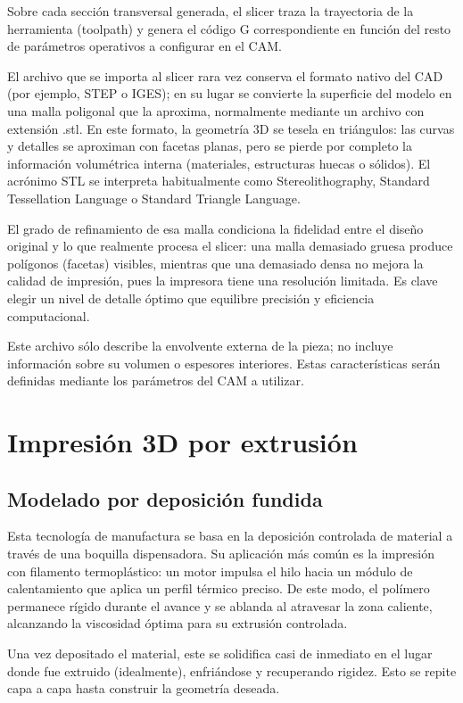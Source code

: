 Sobre cada sección transversal generada, el slicer traza la trayectoria de la herramienta (toolpath) y genera el código G correspondiente en función del resto de parámetros operativos a configurar en el CAM.

El archivo que se importa al slicer rara vez conserva el formato nativo del CAD (por ejemplo, STEP o IGES); en su lugar se convierte la superficie del modelo en una malla poligonal que la aproxima, normalmente mediante un archivo con extensión .stl. En este formato, la geometría 3D se tesela en triángulos: las curvas y detalles se aproximan con facetas planas, pero se pierde por completo la información volumétrica interna (materiales, estructuras huecas o sólidos). El acrónimo STL se interpreta habitualmente como Stereolithography, Standard Tessellation Language o Standard Triangle Language. 

El grado de refinamiento de esa malla condiciona la fidelidad entre el diseño original y lo que realmente procesa el slicer: una malla demasiado gruesa produce polígonos (facetas) visibles, mientras que una demasiado densa no mejora la calidad de impresión, pues la impresora tiene una resolución limitada. Es clave elegir un nivel de detalle óptimo que equilibre precisión y eficiencia computacional.

Este archivo sólo describe la envolvente externa de la pieza; no incluye información sobre su volumen o espesores interiores. Estas características serán definidas mediante los parámetros del CAM a utilizar.

\section{Impresión 3D por extrusión}

\subsection{Modelado por deposición fundida}

Esta tecnología de manufactura se basa en la deposición controlada de material a través de una boquilla dispensadora. Su aplicación más común es la impresión con filamento termoplástico: un motor impulsa el hilo hacia un módulo de calentamiento que aplica un perfil térmico preciso. De este modo, el polímero permanece rígido durante el avance y se ablanda al atravesar la zona caliente, alcanzando la viscosidad óptima para su extrusión controlada.

Una vez depositado el material, este se solidifica casi de inmediato en el lugar donde fue extruido (idealmente), enfriándose y recuperando rigidez. Esto se repite capa a capa hasta construir la geometría deseada.

